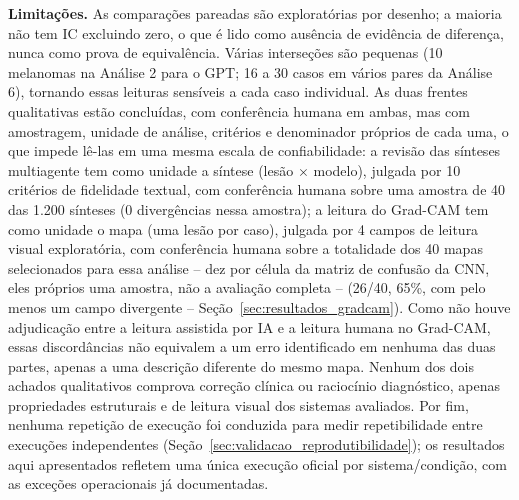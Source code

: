 \textbf{Limitações.} As comparações pareadas são exploratórias por desenho; a maioria não tem IC excluindo zero, o que é lido como ausência de evidência de diferença, nunca como prova de equivalência. Várias interseções são pequenas (10 melanomas na Análise 2 para o GPT; 16 a 30 casos em vários pares da Análise 6), tornando essas leituras sensíveis a cada caso individual. As duas frentes qualitativas estão concluídas, com conferência humana em ambas, mas com amostragem, unidade de análise, critérios e denominador próprios de cada uma, o que impede lê-las em uma mesma escala de confiabilidade: a revisão das sínteses multiagente tem como unidade a síntese (lesão $\times$ modelo), julgada por 10 critérios de fidelidade textual, com conferência humana sobre uma amostra de 40 das 1.200 sínteses (0 divergências nessa amostra); a leitura do Grad-CAM tem como unidade o mapa (uma lesão por caso), julgada por 4 campos de leitura visual exploratória, com conferência humana sobre a totalidade dos 40 mapas selecionados para essa análise -- dez por célula da matriz de confusão da CNN, eles próprios uma amostra, não a avaliação completa -- (26/40, 65\%, com pelo menos um campo divergente -- Seção~\ref{sec:resultados_gradcam}). Como não houve adjudicação entre a leitura assistida por IA e a leitura humana no Grad-CAM, essas discordâncias não equivalem a um erro identificado em nenhuma das duas partes, apenas a uma descrição diferente do mesmo mapa. Nenhum dos dois achados qualitativos comprova correção clínica ou raciocínio diagnóstico, apenas propriedades estruturais e de leitura visual dos sistemas avaliados. Por fim, nenhuma repetição de execução foi conduzida para medir repetibilidade entre execuções independentes (Seção~\ref{sec:validacao_reprodutibilidade}); os resultados aqui apresentados refletem uma única execução oficial por sistema/condição, com as exceções operacionais já documentadas.
